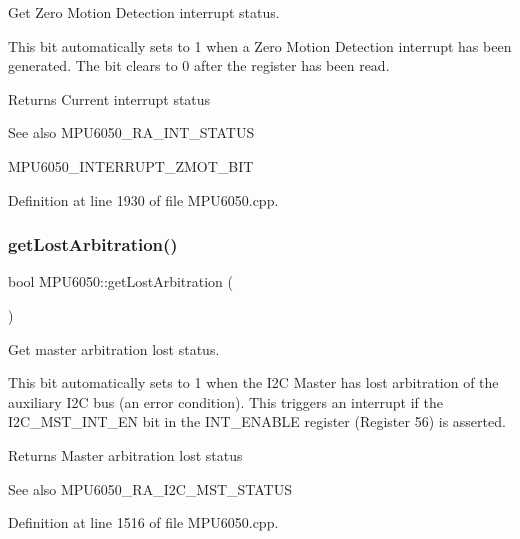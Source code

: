 Get Zero Motion Detection interrupt status. 

This bit automatically sets to 1 when a Zero Motion Detection interrupt has been generated. The bit clears to 0 after the register has been read. \begin{DoxyReturn}{Returns}
Current interrupt status 
\end{DoxyReturn}
\begin{DoxySeeAlso}{See also}
M\+P\+U6050\+\_\+\+R\+A\+\_\+\+I\+N\+T\+\_\+\+S\+T\+A\+T\+US 

M\+P\+U6050\+\_\+\+I\+N\+T\+E\+R\+R\+U\+P\+T\+\_\+\+Z\+M\+O\+T\+\_\+\+B\+IT 
\end{DoxySeeAlso}


Definition at line 1930 of file M\+P\+U6050.\+cpp.

\mbox{\label{classMPU6050_acd775c72f85dabfc6f8fba43da096c6d}} 
\subsubsection{\texorpdfstring{getLostArbitration()}{getLostArbitration()}}
{\footnotesize\ttfamily bool M\+P\+U6050\+::get\+Lost\+Arbitration (\begin{DoxyParamCaption}{ }\end{DoxyParamCaption})}



Get master arbitration lost status. 

This bit automatically sets to 1 when the I2C Master has lost arbitration of the auxiliary I2C bus (an error condition). This triggers an interrupt if the I2\+C\+\_\+\+M\+S\+T\+\_\+\+I\+N\+T\+\_\+\+EN bit in the I\+N\+T\+\_\+\+E\+N\+A\+B\+LE register (Register 56) is asserted. \begin{DoxyReturn}{Returns}
Master arbitration lost status 
\end{DoxyReturn}
\begin{DoxySeeAlso}{See also}
M\+P\+U6050\+\_\+\+R\+A\+\_\+\+I2\+C\+\_\+\+M\+S\+T\+\_\+\+S\+T\+A\+T\+US 
\end{DoxySeeAlso}


Definition at line 1516 of file M\+P\+U6050.\+cpp.

\mbox{\label{classMPU6050_a4cda448ef5c5736bd14188947342d636}} 
